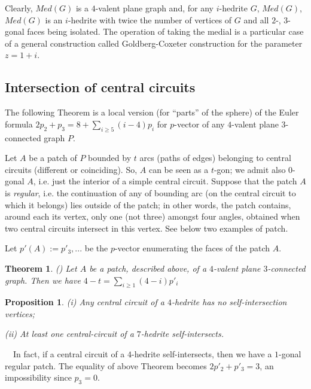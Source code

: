 \documentclass[12pt]{article}
\newtheorem{proposition}{Proposition}
\newtheorem{theor}{Theorem}
\newcommand{\proof}{\noindent{\bf Proof.}\ \ }
\begin{document}
Clearly, $Med(G)$ is a $4$-valent plane graph and, for any $i$-hedrite $G$, $Med(G)$, $Med(G)$ is an $i$-hedrite with twice the number of vertices of $G$ and all $2$-, $3$-gonal faces being isolated. The operation of taking the medial is a particular case of a general construction called Goldberg-Coxeter construction for the parameter $z=1+i$.





\subsection{Intersection of central circuits}

The following Theorem is a local version (for ``parts'' of the sphere) of
the Euler formula
$2p_2+p_3=8+ \sum_{i\geq 5} (i-4)p_i$ for $p$-vector of any $4$-valent 
plane $3$-connected graph $P$.

Let $A$ be a patch of $P$ bounded by $t$ arcs (paths of edges) belonging to 
central circuits (different or coinciding). So, $A$ can be seen as a 
$t$-gon; we admit also $0$-gonal $A$, i.e.
just the interior of a simple central circuit. Suppose that the patch $A$ is
{\em regular}, i.e.
the continuation of any of bounding arc (on the central circuit to which it
belongs) lies outside of the patch; in other words, the patch
contains, around each its vertex, only one (not three) amongst four angles, 
obtained when two central circuits intersect in this vertex.  See below two 
examples of patch.

\begin{center}
\epsfxsize=60mm
\end{center}

Let $p'(A):=p'_3,...$ be the $p$-vector enumerating the faces of the patch $A$. 

\begin{theor} \label{Local-Euler-Formula}(\cite{DSt})
Let $A$ be a patch, described above, of a $4$-valent plane $3$-connected 
graph. Then we have $4-t=\sum_{i\geq 1} (4-i)p'_i$
\end{theor}



\begin{proposition}
(i) Any central circuit of a $4$-hedrite has no self-intersection vertices;

(ii) At least one central-circuit of a $7$-hedrite self-intersects.
\end{proposition}
\proof In fact, if a central circuit of a $4$-hedrite self-intersects, then we have a $1$-gonal regular patch. The equality of above Theorem becomes $2p'_2+p'_3=3$, an impossibility since $p_3=0$.
\end{document}
